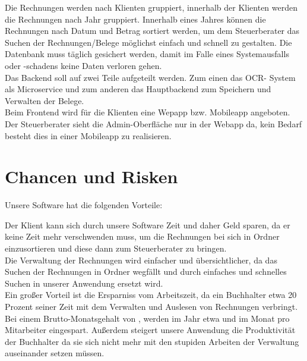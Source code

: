 \documentclass[12pt]{article}
\theoremstyle{definition}
\begin{document}
Die Rechnungen werden nach Klienten gruppiert, innerhalb der Klienten werden die Rechnungen nach Jahr gruppiert. Innerhalb eines Jahres können die Rechnungen nach Datum und Betrag sortiert werden, um dem Steuerberater das Suchen der Rechnungen/Belege möglichst einfach und schnell zu gestalten.
Die Datenbank muss täglich gesichert werden, damit im Falle eines Systemausfalls oder -schadens keine Daten verloren gehen. \\

Das Backend soll auf zwei Teile aufgeteilt werden. Zum einen das OCR- System als Microservice und zum anderen das Hauptbackend zum Speichern und Verwalten der Belege.\\

Beim Frontend wird für die Klienten eine Wepapp bzw. Mobileapp angeboten. Der Steuerberater sieht die Admin-Oberfläche nur in der Webapp da, kein Bedarf besteht dies in einer Mobileapp zu realisieren.


\pagebreak
\section{Chancen und Risken}


Unsere Software hat die folgenden Vorteile:
\begin{itemize}
\end{itemize}
Der Klient kann sich durch unsere Software Zeit und daher Geld sparen, da er keine Zeit mehr verschwenden muss, um die Rechnungen bei sich in Ordner einzusortieren und diese dann zum Steuerberater zu bringen.\\

Die Verwaltung der Rechnungen wird einfacher und übersichtlicher, da das Suchen der Rechnungen in Ordner wegfällt und durch einfaches und schnelles Suchen in unserer Anwendung ersetzt wird.\\

Ein großer Vorteil ist die Ersparniss vom Arbeitszeit, da ein Buchhalter etwa 20 Prozent seiner Zeit mit dem Verwalten und Auslesen von Rechnungen verbringt. Bei einem Brutto-Monatsgehalt von , werden im Jahr etwa  und im Monat  pro Mitarbeiter eingespart. Außerdem steigert unsere Anwendung die Produktivität der Buchhalter da sie sich nicht mehr mit den stupiden Arbeiten der Verwaltung auseinander setzen müssen.
\end{document}

